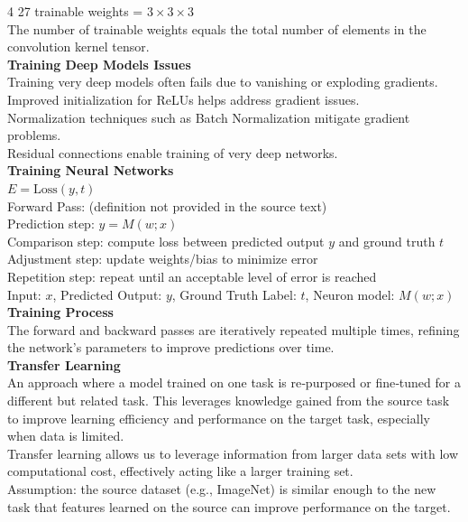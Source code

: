 \documentclass[8pt]{extarticle}
\begin{document}
\begin{multicols}{4}
27 trainable weights = $3 \times 3 \times 3$\\
The number of trainable weights equals the total number of elements in the convolution kernel tensor.\\
\vspace{2pt}\textbf{Training Deep Models Issues}\\
Training very deep models often fails due to vanishing or exploding gradients.\\
Improved initialization for ReLUs helps address gradient issues.\\
Normalization techniques such as Batch Normalization mitigate gradient problems.\\
Residual connections enable training of very deep networks.\\
\vspace{2pt}\textbf{Training Neural Networks}\\
$E = \text{Loss}(y, t)$\\
Forward Pass: (definition not provided in the source text)\\
Prediction step: $y = M(w; x)$\\
Comparison step: compute loss between predicted output $y$ and ground truth $t$\\
Adjustment step: update weights/bias to minimize error\\
Repetition step: repeat until an acceptable level of error is reached\\
Input: $x$, Predicted Output: $y$, Ground Truth Label: $t$, Neuron model: $M(w; x)$\\
\vspace{2pt}\textbf{Training Process}\\
The forward and backward passes are iteratively repeated multiple times, refining the network’s parameters to improve predictions over time.\\
\vspace{2pt}\textbf{Transfer Learning}\\
An approach where a model trained on one task is re‑purposed or fine‑tuned for a different but related task. This leverages knowledge gained from the source task to improve learning efficiency and performance on the target task, especially when data is limited.\\
Transfer learning allows us to leverage information from larger data sets with low computational cost, effectively acting like a larger training set.\\
Assumption: the source dataset (e.g., ImageNet) is similar enough to the new task that features learned on the source can improve performance on the target.\\

\end{multicols}
\end{document}
